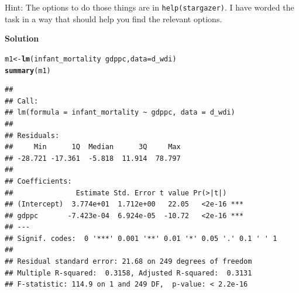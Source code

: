 \documentclass{article}\usepackage[]{graphicx}\usepackage[]{color}
\makeatletter
\newcommand{\hlopt}[1]{\textcolor[rgb]{0,0,0}{#1}}%
\newcommand{\hlstd}[1]{\textcolor[rgb]{0.345,0.345,0.345}{#1}}%
\newcommand{\hlkwb}[1]{\textcolor[rgb]{0.69,0.353,0.396}{#1}}%
\newcommand{\hlkwc}[1]{\textcolor[rgb]{0.333,0.667,0.333}{#1}}%
\newcommand{\hlkwd}[1]{\textcolor[rgb]{0.737,0.353,0.396}{\textbf{#1}}}%
\newenvironment{kframe}{%
 \def\at@end@of@kframe{}%
 \ifinner\ifhmode%
  \def\at@end@of@kframe{\end{minipage}}%
  \begin{minipage}{\columnwidth}%
 \fi\fi%
 \def\FrameCommand##1{\hskip\@totalleftmargin \hskip-\fboxsep
 \colorbox{shadecolor}{##1}\hskip-\fboxsep
     \hskip-\linewidth \hskip-\@totalleftmargin \hskip\columnwidth}%
 \MakeFramed {\advance\hsize-\width
   \@totalleftmargin\z@ \linewidth\hsize
   \@setminipage}}%
 {\par\unskip\endMakeFramed%
 \at@end@of@kframe}
\newenvironment{knitrout}{}{} %
\makeatother
\begin{document}
Hint: The options to do those things are in \verb`help(stargazer)`. I have worded the task in a way that should help you find the relevant options.

\textbf{Solution}

\begin{knitrout}
\color{fgcolor}\begin{kframe}
\begin{alltt}
\hlstd{m1} \hlkwb{<-} \hlkwd{lm}\hlstd{(infant_mortality} \hlopt{~} \hlstd{gdppc,} \hlkwc{data} \hlstd{= d_wdi)}
\hlkwd{summary}\hlstd{(m1)}
\end{alltt}
\begin{verbatim}
## 
## Call:
## lm(formula = infant_mortality ~ gdppc, data = d_wdi)
## 
## Residuals:
##     Min      1Q  Median      3Q     Max 
## -28.721 -17.361  -5.818  11.914  78.797 
## 
## Coefficients:
##               Estimate Std. Error t value Pr(>|t|)    
## (Intercept)  3.774e+01  1.712e+00   22.05   <2e-16 ***
## gdppc       -7.423e-04  6.924e-05  -10.72   <2e-16 ***
## ---
## Signif. codes:  0 '***' 0.001 '**' 0.01 '*' 0.05 '.' 0.1 ' ' 1
## 
## Residual standard error: 21.68 on 249 degrees of freedom
## Multiple R-squared:  0.3158,	Adjusted R-squared:  0.3131 
## F-statistic: 114.9 on 1 and 249 DF,  p-value: < 2.2e-16
\end{verbatim}
\end{kframe}
\end{knitrout}
\end{document}
